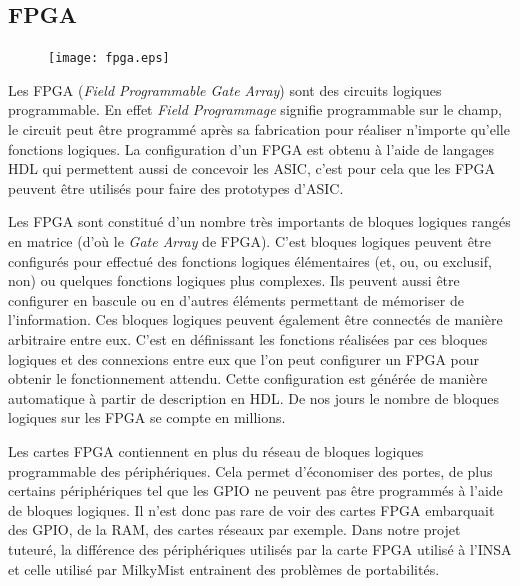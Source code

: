 \subsection{FPGA}

\begin{figure}
\begin{center}
\texttt{[image: fpga.eps]}
\end{center}
\end{figure}

Les FPGA (\textit{Field Programmable Gate Array}) sont des circuits logiques
programmable. En effet \textit{Field Programmage} signifie programmable sur le champ,
le circuit peut être programmé après sa fabrication pour réaliser n'importe qu'elle
fonctions logiques. La configuration d'un FPGA est obtenu à l'aide de langages HDL
qui permettent aussi de concevoir les ASIC, c'est pour cela que les FPGA peuvent être
utilisés pour faire des prototypes d'ASIC.

Les FPGA sont constitué d'un nombre très importants de bloques logiques rangés en
matrice (d'où le \textit{Gate Array} de FPGA). C'est bloques logiques peuvent être
configurés pour effectué des fonctions logiques élémentaires (et, ou, ou exclusif,
non) ou quelques fonctions logiques plus complexes. Ils peuvent aussi être configurer
en bascule ou en d'autres éléments permettant de mémoriser de l'information. Ces
bloques logiques peuvent également être connectés de manière arbitraire entre eux.
C'est en définissant les fonctions réalisées par ces bloques logiques et des
connexions entre eux que l'on peut configurer un FPGA pour obtenir le fonctionnement
attendu. Cette configuration est générée de manière automatique à partir de
description en HDL. De nos jours le nombre de bloques logiques sur les FPGA se compte
en millions. 

Les cartes FPGA contiennent en plus du réseau de bloques logiques programmable des
périphériques. Cela permet d'économiser des portes, de plus certains périphériques
tel que les GPIO ne peuvent pas être programmés à l'aide de bloques logiques. Il
n'est donc pas rare de voir des cartes FPGA embarquait des GPIO, de la RAM, des
cartes réseaux par exemple. Dans notre projet tuteuré, la différence des
périphériques utilisés par la carte FPGA utilisé à l'INSA et celle utilisé par
MilkyMist entrainent des problèmes de portabilités.

